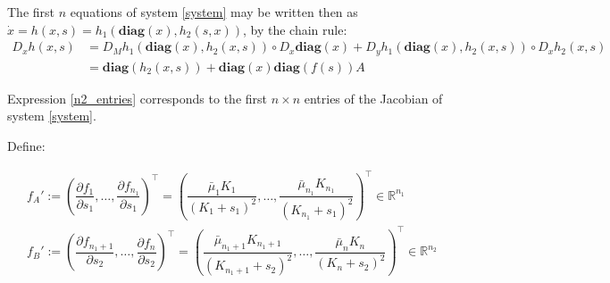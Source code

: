 \documentclass[3p,times]{article}
\newcommand{\R}{\mathbb{R}}
\newcommand{\diag}{\textbf{diag}}
\begin{document}
The first $n$ equations of system \eqref{system} may be written then as $\dot{x} =  h(x,s) = h_1(\diag(x), h_2(s,x))$, by the chain rule: 
\begin{align} D_xh(x,s) &= D_M h_1(\diag(x),h_2(x,s))\circ D_x \diag (x) + D_yh_1(\diag(x),h_2(x,s))\circ D_xh_2(x,s)  \\ &=
\diag(h_2(x,s))+\diag(x)\diag(f(s))A  \label{n2_entries}
\end{align}

Expression \eqref{n2_entries} corresponds to the first $n\times n$ entries of the Jacobian of system \eqref{system}.

Define:

\begin{align*}
f_A' := \left( \dfrac{\partial f_1}{\partial s_1}, \dots, \dfrac{\partial f_{n_1}}{\partial s_1} \right)^\top = \left(\dfrac{\bar{\mu}_1K_1}{(K_1 + s_1)^2},\dots, \dfrac{\bar{\mu}_{n_1}K_{n_1}}{(K_{n_1} + s_1)^2} \right)^\top \in \R^{n_1} \\
f_B' := \left( \dfrac{\partial f_{n_1+1}}{\partial s_2}, \dots, \dfrac{\partial f_{n}}{\partial s_2} \right)^\top = \left( \dfrac{\bar{\mu}_{n_1+1}K_{n_1+1}}{(K_{n_1+1} + s_2)^2},\dots, \dfrac{\bar{\mu}_{n}K_{n}}{(K_{n} + s_2)^2} \right)^\top \in \R^{n_2}
\end{align*}
\end{document}

